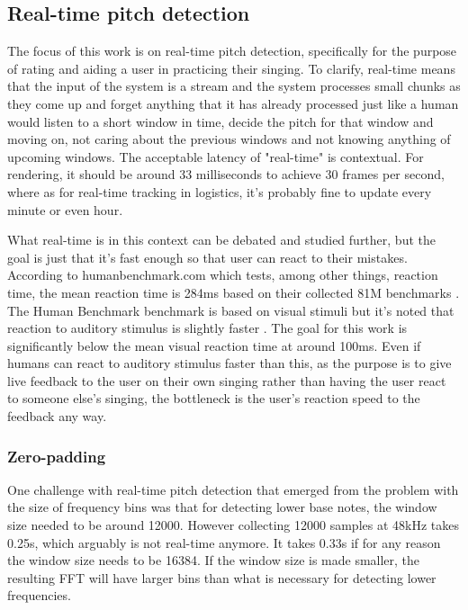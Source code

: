 \subsection{Real-time pitch detection}
The focus of this work is on real-time pitch detection, specifically for the purpose of rating and aiding a user in practicing their singing. To clarify, real-time means that the input of the system is a stream and the system processes small chunks as they come up and forget anything that it has already processed just like a human would listen to a short window in time, decide the pitch for that window and moving on, not caring about the previous windows and not knowing anything of upcoming windows. The acceptable latency of "real-time" is contextual. For rendering, it should be around 33 milliseconds to achieve 30 frames per second, where as for real-time tracking in logistics, it's probably fine to update every minute or even hour. 

What real-time is in this context can be debated and studied further, but the goal is just that it's fast enough so that user can react to their mistakes. According to humanbenchmark.com which tests, among other things, reaction time, the mean reaction time is 284ms based on their collected 81M benchmarks \cite{HumanBenchmark2025}. The Human Benchmark benchmark is based on visual stimuli but it's noted that reaction to auditory stimulus is slightly faster \cite{SheltonKumar2010}. The goal for this work is significantly below the mean visual reaction time at around 100ms. Even if humans can react to auditory stimulus faster than this, as the purpose is to give live feedback to the user on their own singing rather than having the user react to someone else's singing, the bottleneck is the user's reaction speed to the feedback any way. 

\subsubsection{Zero-padding}
One challenge with real-time pitch detection that emerged from the problem with the size of frequency bins was that for detecting lower base notes, the window size needed to be around 12000. However collecting 12000 samples at 48kHz takes 0.25s, which arguably is not real-time anymore. It takes 0.33s if for any reason the window size needs to be 16384. If the window size is made smaller, the resulting FFT will have larger bins than what is necessary for detecting lower frequencies. 

